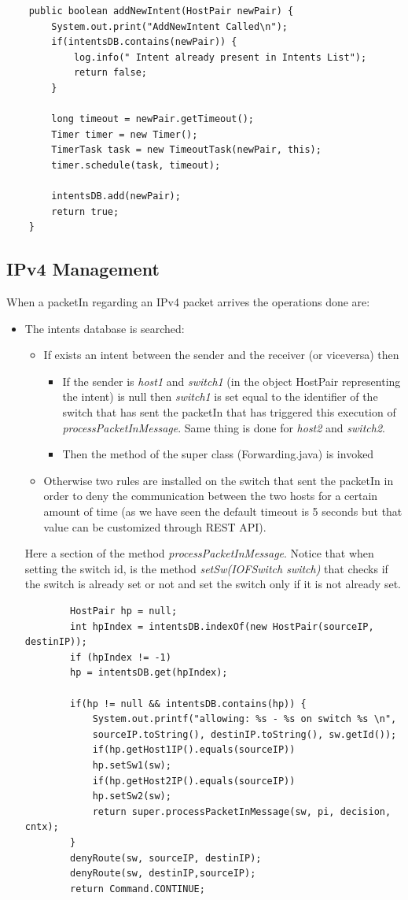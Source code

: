 \documentclass[a4paper]{report}
\begin{document}
\begin{lstlisting}
	public boolean addNewIntent(HostPair newPair) {
		System.out.print("AddNewIntent Called\n");
		if(intentsDB.contains(newPair)) {
			log.info(" Intent already present in Intents List");
			return false;
		}
		
		long timeout = newPair.getTimeout();
		Timer timer = new Timer();
		TimerTask task = new TimeoutTask(newPair, this);
		timer.schedule(task, timeout);
		
		intentsDB.add(newPair);
		return true;
	}
\end{lstlisting}

\subsection{IPv4 Management}\label{sec:Ipv4}
\noindent When a packetIn regarding an IPv4 packet arrives the operations done are:
\begin{itemize}
	\item The intents database is searched:
	\begin{itemize}
		\item If exists an intent between the sender and the receiver (or viceversa) then
		\begin{itemize}
			\item If the sender is \textit{host1} and \textit{switch1} (in the object HostPair representing the intent) is null then \textit{switch1} is set equal to the identifier of the switch that has sent the packetIn that has triggered this execution of \textit{processPacketInMessage}. Same thing is done for \textit{host2} and \textit{switch2}. 
			\item Then the method of the super class (Forwarding.java) is invoked 
		\end{itemize} 
		\item Otherwise two rules are installed on the switch that sent the packetIn in order to deny the communication between the two hosts for a certain amount of time (as we have seen the default timeout is 5 seconds but that value can be customized through REST API).
	\end{itemize}
	\noindent Here a section of the method \textit{processPacketInMessage}. Notice that when setting the switch id, is the method \textit{setSw(IOFSwitch switch)} that checks if the switch is already set or not and set the switch only if it is not already set.
	\begin{lstlisting}
		HostPair hp = null;
		int hpIndex = intentsDB.indexOf(new HostPair(sourceIP, destinIP));
		if (hpIndex != -1)
		hp = intentsDB.get(hpIndex);
		
		if(hp != null && intentsDB.contains(hp)) {
			System.out.printf("allowing: %s - %s on switch %s \n",
			sourceIP.toString(), destinIP.toString(), sw.getId());	
			if(hp.getHost1IP().equals(sourceIP))
			hp.setSw1(sw);
			if(hp.getHost2IP().equals(sourceIP))
			hp.setSw2(sw);
			return super.processPacketInMessage(sw, pi, decision, cntx);	
		}
		denyRoute(sw, sourceIP, destinIP);
		denyRoute(sw, destinIP,sourceIP);
		return Command.CONTINUE;
	\end{lstlisting}
\end{itemize}
\end{document}
